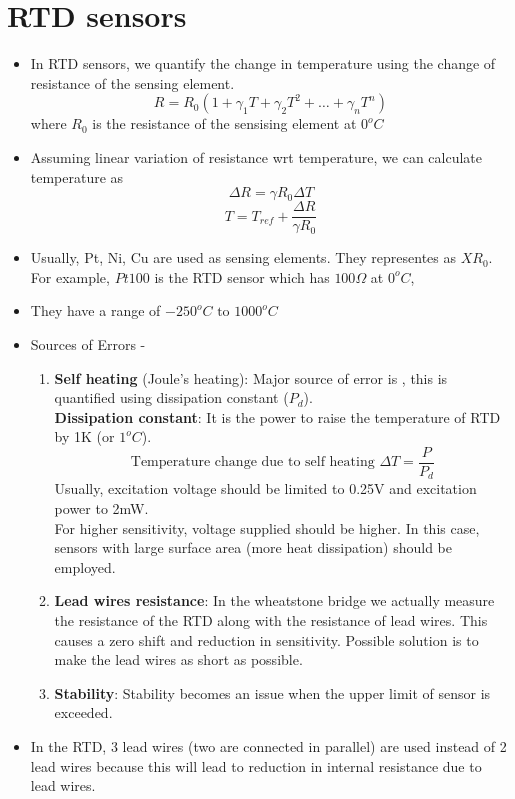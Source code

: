 \documentclass{article}
\begin{document}
\section{RTD sensors}
\begin{itemize}
	\item In RTD sensors, we quantify the change in temperature using the change of resistance of the sensing element.
	\[R = R_0 (1+ \gamma_1 T + \gamma_2 T^2 + \hdots + \gamma_n T^n)\]
	where $R_0$ is the resistance of the sensising element at $0^o C$

	\item Assuming linear variation of resistance wrt temperature, we can calculate temperature as 
	\[\Delta R = \gamma R_0 \Delta T\]
	\[T = T_{ref} + \frac{\Delta R}{\gamma R_0}\]

	\item Usually, Pt, Ni, Cu are used as sensing elements. They representes as $XR_0$. For example, $Pt100$ is the RTD sensor which has $100\Omega$ at $0^o C$,
	\item They have a range of $-250^o C \text{ to } 1000^o C$

	\item Sources of Errors -
	\begin{enumerate}
		\item \textbf{Self heating} (Joule's heating): Major source of error is  , this is quantified using dissipation constant ($P_d$).\\
		\textbf{Dissipation constant}: It is the power to raise the temperature of RTD by 1K (or $1^o C$).\\
		\[\text{Temperature change due to self heating } \Delta T = \frac{P}{P_d}\]
		Usually, excitation voltage should be limited to 0.25V and excitation power to 2mW.\\
		For higher sensitivity, voltage supplied should be higher. In this case, sensors with large surface area (more heat dissipation) should be employed.
		\item \textbf{Lead wires resistance}: In the wheatstone bridge we actually measure the resistance of the RTD along with the resistance of lead wires. This causes a zero shift and reduction in sensitivity. Possible solution is to make the lead wires as short as possible.
		\item \textbf{Stability}: Stability becomes an issue when the upper limit of sensor is exceeded.
	\end{enumerate}

	\item In the RTD, 3 lead wires (two are connected in parallel) are used instead of 2 lead wires because this will lead to reduction in internal resistance due to lead wires. 

\end{itemize}
\end{document}
